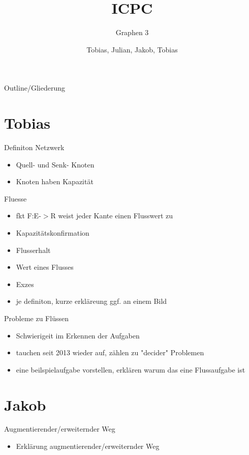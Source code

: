\documentclass[18pt]{beamer}
\title[Graphen 3]{ICPC}
\subtitle{Graphen 3}
\author{Tobias, Julian, Jakob, Tobias}
\institute{ITI Wagner, IPD Tichy}
\begin{document}
	
	
	\begin{frame}
	\titlepage
\end{frame}

\begin{frame}{Outline/Gliederung}
\tableofcontents
\end{frame}

\section{Tobias}
\begin{frame}{Definiton Netzwerk}
\begin{itemize}
\item Quell- und  Senk- Knoten
\item Knoten haben Kapazit\"at
\end{itemize}
\end{frame}

\begin{frame}{Fluesse}
\begin{itemize}
\item fkt F:E-$>$R weist jeder Kante einen Flusswert zu
\item Kapazit\"atskonfirmation
\item Flusserhalt
\item Wert eines Flusses
\item Exzes
\item je definiton, kurze erkl\"areung ggf. an einem Bild
\end{itemize}
\end{frame}

\begin{frame}{Probleme zu Fl\"ussen}
\begin{itemize}
\item Schwierigeit im Erkennen der Aufgaben
\item tauchen seit 2013 wieder auf, zählen zu "decider" Problemen
\item eine beilspielaufgabe vorstellen, erkl\"aren warum das eine Flussaufgabe ist
\end{itemize}
\end{frame}

\section{Jakob}
\begin{frame}{Augmentierender/erweiternder Weg}
\begin{itemize}
\item Erkl\"arung augmentierender/erweiternder Weg
\end{itemize}
\end{frame}
\end{document}
